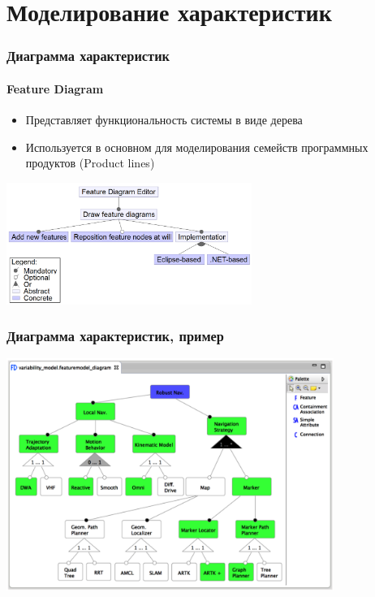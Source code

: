 \documentclass{../../slides-style}
\begin{document}
    \section{Моделирование характеристик}

    \begin{frame}
        \frametitle{Диаграмма характеристик}
        \framesubtitle{Feature Diagram}
        \begin{itemize}
            \item Представляет функциональность системы в виде дерева
            \item Используется в основном для моделирования семейств программных продуктов (Product lines)
        \end{itemize}
        \begin{center}
            \includegraphics[width=0.6\textwidth]{featureDiagram.png}
        \end{center}
    \end{frame}

    \begin{frame}
        \frametitle{Диаграмма характеристик, пример}
        \begin{center}
            \includegraphics[width=0.8\textwidth]{featureDiagramExample.png}
        \end{center}
    \end{frame}
\end{document}
